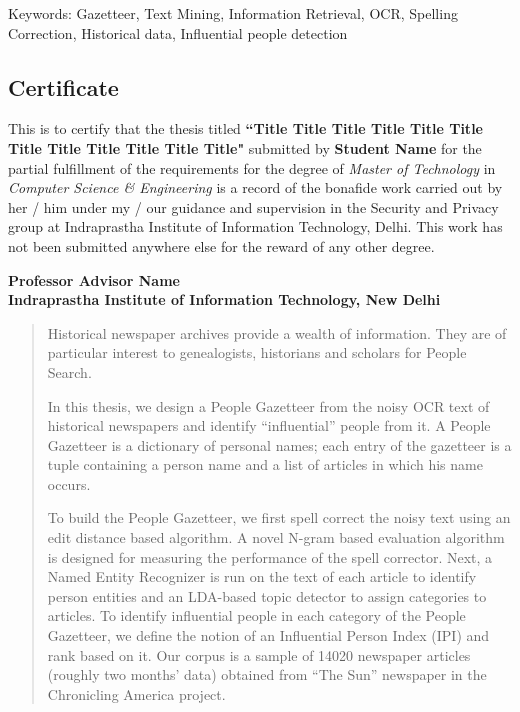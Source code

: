\documentclass[letterpaper,11pt]{report}
\begin{document}


\newpage

\pagestyle{empty}
\vspace*{7.1in} 
Keywords: Gazetteer, Text Mining, Information Retrieval, OCR, Spelling Correction, Historical data, Influential people detection

\newpage

\begin{center}
\section*{Certificate}\label{section:certificate}
\end{center}
This is to certify that the thesis titled \textbf{``Title Title Title Title Title Title Title Title Title Title Title Title"} submitted by \textbf{Student Name} for the partial fulfillment of the requirements for the degree of \emph{Master of Technology} in \emph{Computer Science \& Engineering} is a record of the bonafide work carried out by her / him under my / our guidance and supervision in the Security and Privacy group at Indraprastha Institute of Information Technology, Delhi. This work has not been submitted anywhere else for the reward of any other degree. \\ \vspace{0.5in}

\textbf{Professor Advisor Name}\\
\textbf{Indraprastha Institute of Information Technology, New Delhi}

\begin{abstract}

 Historical newspaper archives provide a wealth of information. They
are of particular interest to genealogists, historians and scholars
for People Search.

 In this thesis, we design a People Gazetteer from
the noisy OCR text of historical newspapers and identify “influential”
people from it. A People Gazetteer is a dictionary of personal names;
each entry of the gazetteer is  a tuple containing a person name and a
list of articles in which his name occurs.

To build the People Gazetteer, we first spell correct the noisy text
using an edit distance based algorithm. A novel N-gram based
evaluation algorithm is designed for measuring the performance of the
spell corrector. Next, a Named Entity Recognizer is run on the text of
each article to identify person entities and an LDA-based topic
detector to assign categories to articles. To identify influential
people in each category of the People Gazetteer, we define the notion
of an Influential Person Index (IPI) and rank based on it. Our corpus
is a sample of 14020 newspaper articles (roughly two months’ data)
obtained from “The Sun” newspaper in the Chronicling America project.

\end{abstract}
\end{document}
